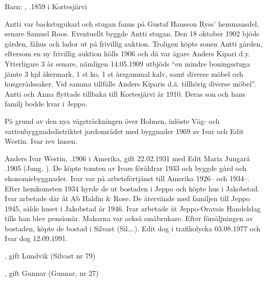 Barn: , .1859 i Kortesjärvi

Antti var backstugukarl och stugan fanns på Gustaf Hansson Ryss' hemmansdel, senare Samuel Roos. Eventuellt byggde Antti stugan. Den 18 oktober 1902 bjöds gården, fähus och lador ut på frivillig auktion. Troligen köpte sonen Antti gården, eftersom en ny frivillig auktion hölls 1906 och då var ägare Anders Kipari d.y. Ytterligare 3 år senare, nämligen 14.05.1909 utbjöds ``en mindre boningsstuga jämte 3 kpl åkermark, 1 st ko, 1 st årsgammal kalv, samt diverse möbel och husgerådssaker. Vid samma tillfälle Anders Kiparis d.ä. tillhörig diverse möbel''. Antti och Anna flyttade tillbaka till Kortesjärvi år 1910. Deras son och hans familj bodde kvar i Jeppo.






På grund av den nya vägsträckningen över Holmen, inlöste Väg- och vattenbyggnadsdistriktet jordområdet med byggnader 1969 av Ivar och Edit Westin. Ivar rev husen.

Anders Ivar Westin, .1906 i Amerika, gift 22.02.1931 med Edit Maria Jungarå .1905 (Jung.       ). De köpte tomten av Ivars föräldrar 1933 och byggde gård och ekonomiebyggnader. Ivar var på arbetsförtjänst till Amerika 1926-- och 1934--. Efter hemkomsten 1934 hyrde de ut bostaden i Jeppo och köpte hus i Jakobstad. Ivar arbetade där åt Ab Haldin \& Rose. De återvände  med familjen till Jeppo 1945, sålde huset i Jakobstad år 1946. Ivar arbetade åt Jeppo-Oravais Handelslag tills han blev pensionär. Makarna var också småbrukare. Efter försäljningen av bostaden, köpte de bostad i Silvast (Sil….). Edit dog i trafikolycka 03.08.1977 och Ivar dog 12.09.1991.
\begin{jhchildren}
  \item {}, gift Lundvik (Silvast nr 79)
  \item {}, gift Gunnar (Gunnar, nr 27)
\end{jhchildren}





